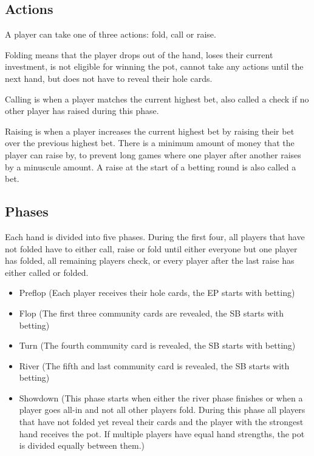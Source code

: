 \subsection{Actions}
A player can take one of three actions: fold, call or raise.

Folding means that the player drops out of the hand, loses their current investment, is not eligible for winning the pot, cannot take any actions until the next hand, but does not have to reveal their hole cards.

Calling is when a player matches the current highest bet, also called a check if no other player has raised during this phase.

Raising is when a player increases the current highest bet by raising their bet over the previous highest bet. There is a minimum amount of money that the player can raise by, to prevent long games where one player after another raises by a minuscule amount. A raise at the start of a betting round is also called a bet.

\subsection{Phases}
Each hand is divided into five phases. During the first four, all players that have not folded have to either call, raise or fold until either everyone but one player has folded, all remaining players check, or every player after the last raise has either called or folded.

\begin{itemize}
  \item Preflop (Each player receives their hole cards, the EP starts with betting)
  \item Flop (The first three community cards are revealed, the SB starts with betting)
  \item Turn (The fourth community card is revealed, the SB starts with betting)
  \item River (The fifth and last community card is revealed, the SB starts with betting)
  \item Showdown (This phase starts when either the river phase finishes or when a player goes all-in and not all other players fold. During this phase all players that have not folded yet reveal their cards and the player with the strongest hand receives the pot. If multiple players have equal hand strengths, the pot is divided equally between them.)
\end{itemize}

